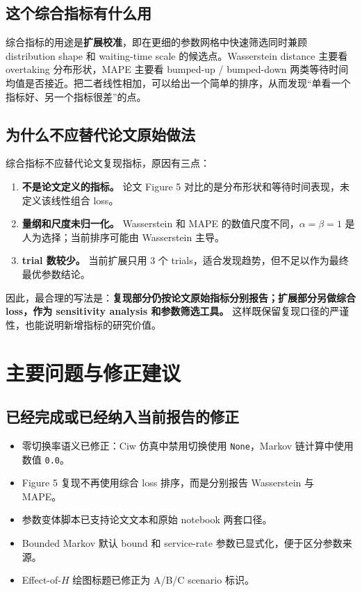 \documentclass[UTF8,a4paper,11pt]{ctexart}
\newcommand{\code}[1]{\texttt{#1}}
\begin{document}
\subsection{这个综合指标有什么用}

综合指标的用途是\textbf{扩展校准}，即在更细的参数网格中快速筛选同时兼顾 distribution shape 和 waiting-time scale 的候选点。Wasserstein distance 主要看 overtaking 分布形状，MAPE 主要看 bumped-up / bumped-down 两类等待时间均值是否接近。把二者线性相加，可以给出一个简单的排序，从而发现“单看一个指标好、另一个指标很差”的点。

\subsection{为什么不应替代论文原始做法}

综合指标不应替代论文复现指标，原因有三点：

\begin{enumerate}
  \item \textbf{不是论文定义的指标。} 论文 Figure 5 对比的是分布形状和等待时间表现，未定义该线性组合 loss。
  \item \textbf{量纲和尺度未归一化。} Wasserstein 和 MAPE 的数值尺度不同，$\alpha=\beta=1$ 是人为选择；当前排序可能由 Wasserstein 主导。
  \item \textbf{trial 数较少。} 当前扩展只用 3 个 trials，适合发现趋势，但不足以作为最终最优参数结论。
\end{enumerate}

因此，最合理的写法是：\textbf{复现部分仍按论文原始指标分别报告；扩展部分另做综合 loss，作为 sensitivity analysis 和参数筛选工具。} 这样既保留复现口径的严谨性，也能说明新增指标的研究价值。

\section{主要问题与修正建议}

\subsection{已经完成或已经纳入当前报告的修正}

\begin{itemize}
  \item 零切换率语义已修正：Ciw 仿真中禁用切换使用 \code{None}，Markov 链计算中使用数值 \code{0.0}。
  \item Figure 5 复现不再使用综合 loss 排序，而是分别报告 Wasserstein 与 MAPE。
  \item 参数变体脚本已支持论文文本和原始 notebook 两套口径。
  \item Bounded Markov 默认 bound 和 service-rate 参数已显式化，便于区分参数来源。
  \item Effect-of-$H$ 绘图标题已修正为 A/B/C scenario 标识。
\end{itemize}
\end{document}
